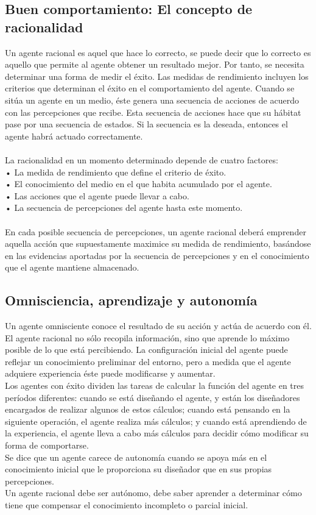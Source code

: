 \documentclass[12pt,a4paper]{report}
\begin{document}
\subsection*{Buen comportamiento: El concepto de racionalidad}
Un agente racional es aquel que hace lo correcto, se puede decir que lo correcto es aquello que permite al agente obtener un resultado mejor. Por tanto, se necesita determinar una forma de medir el éxito. Las medidas de rendimiento incluyen los criterios que determinan el éxito en el comportamiento del agente. Cuando se sitúa un agente en un medio, éste genera una secuencia de acciones de acuerdo con las percepciones que recibe. Esta secuencia de acciones hace que su hábitat pase por una secuencia de estados. Si la secuencia es la deseada, entonces el agente habrá actuado correctamente.\\\\ La racionalidad en un momento determinado depende de cuatro factores:\\• La medida de rendimiento que define el criterio de éxito.\\• El conocimiento del medio en el que habita acumulado por el agente.\\• Las acciones que el agente puede llevar a cabo.\\• La secuencia de percepciones del agente hasta este momento.\\\\En cada posible secuencia de percepciones, un agente racional deberá emprender aquella acción que supuestamente maximice su medida de rendimiento, basándose en las evidencias aportadas por la secuencia de percepciones y en el conocimiento que el agente
mantiene almacenado.
\subsection*{Omnisciencia, aprendizaje y autonomía}
Un agente omnisciente conoce el resultado de su acción y actúa de acuerdo con él. El agente racional no sólo recopila información, sino que aprende lo máximo posible de lo que está percibiendo. La configuración inicial del agente puede reflejar un conocimiento preliminar del entorno, pero a medida que el agente adquiere experiencia éste puede modificarse y aumentar.\\Los agentes con éxito dividen las tareas de calcular la función del agente en tres períodos diferentes: cuando se está diseñando el agente, y están los diseñadores encargados de realizar algunos de estos cálculos; cuando está pensando en la siguiente operación, el agente realiza más cálculos; y cuando está aprendiendo de la experiencia, el agente lleva a cabo más cálculos para decidir cómo modificar su forma de comportarse.
\\Se dice que un agente carece de autonomía cuando se apoya más en el conocimiento inicial que le proporciona su diseñador que en sus propias percepciones.\\Un agente racional debe ser autónomo, debe saber aprender a determinar cómo tiene que compensar el conocimiento incompleto o parcial inicial.
\end{document}
